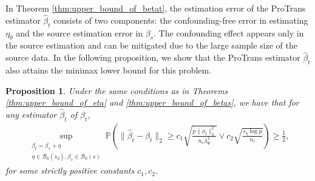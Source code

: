\documentclass[12pt]{article}
\newtheorem{prop}{Proposition}
\begin{document}
In Theorem \ref{thm:upper_bound_of_betat}, the estimation error of the ProTrans estimator $\hat{\beta}_t$ consists of two components: the confounding-free error in estimating $\eta_0$ and the source estimation error in $\beta_s$. The confounding effect appears only in the source estimation and can be mitigated due to the large sample size of the source data. In the following proposition, we show that the ProTrans estimator $\hat{\beta}_t$ also attains the minimax lower bound for this problem. 
\begin{prop}
    \label{prop:minimax_for_beta_t}
    Under the same conditions as in Theorems \ref{thm:upper_bound_of_eta} and \ref{thm:upper_bound_of_betas}, we have that for any estimator $\hat{\beta}_t$ of $\beta_t$,
     \begin{align*}
     \underset{\substack{\beta_t = \beta_s + \eta \\ \eta \in \mathcal{B}_0(s_\eta),\beta_s\in \mathcal{B}_0(s)}}{\sup} \mathbb{P}\left(\|\hat{\beta}_t - \beta_t\|_2 \ge c_1 \sqrt{\frac{p\|\phi_t\|_2^2}{n_s\lambda_\Psi^2} }\vee c_2\sqrt{\frac{s_\eta\log p}{n_t}} \right)\ge \frac{1}{2},
     \end{align*} 
     for some strictly positive constants $c_1,c_2$. 
\end{prop}
\end{document}
